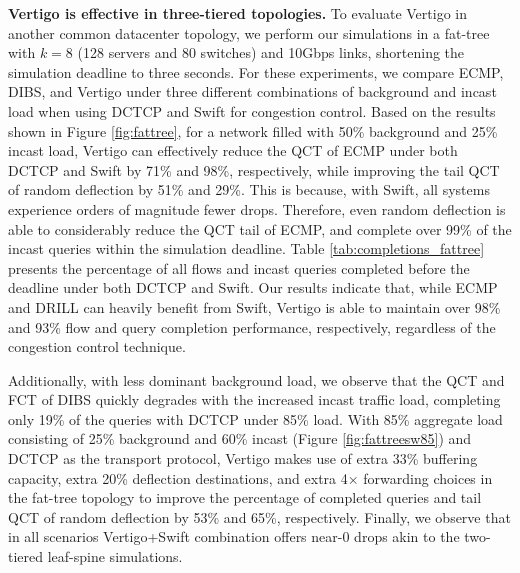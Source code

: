 \textbf{Vertigo is effective in three-tiered topologies.}
To evaluate Vertigo in another common datacenter topology, we perform our simulations in a fat-tree \cite{fattree} with $k=8$ (128 servers and 80 switches) and 10Gbps links, shortening the simulation deadline to three seconds. For these experiments, we compare ECMP, DIBS, and Vertigo under three different combinations of background and incast load when using DCTCP and Swift for congestion control. Based on the results shown in Figure \ref{fig:fattree}, for a network filled with 50\% background and 25\% incast load, Vertigo can effectively reduce the QCT of ECMP under both DCTCP and Swift by 71\% and 98\%, respectively, while improving the tail QCT of random deflection by 51\% and 29\%.
This is because, with Swift, all systems experience orders of magnitude fewer drops. Therefore, even random deflection is able to considerably reduce the QCT tail of ECMP, and complete over 99\% of the incast queries within the simulation deadline. 
Table \ref{tab:completions_fattree} presents the percentage of all flows and incast queries completed before the deadline under both DCTCP and Swift. Our results indicate that, while ECMP and DRILL can heavily benefit from Swift, Vertigo is able to maintain over 98\% and 93\% flow and query completion performance, respectively, regardless of the congestion control technique. 




Additionally, with less dominant background load, we observe that the QCT and FCT of DIBS quickly degrades with the increased incast traffic load, completing only 19\% of the queries with DCTCP under 85\% load. With 85\% aggregate load consisting of 25\% background and 60\% incast (Figure \ref{fig:fattreesw85}) and DCTCP as the transport protocol, Vertigo makes use of extra 33\% buffering capacity, extra 20\% deflection destinations, and extra 4$\times$ forwarding choices in the fat-tree topology to improve the percentage of completed queries and tail QCT of random deflection by 53\% and 65\%, respectively. Finally, we observe that in all scenarios Vertigo+Swift combination offers near-0 drops akin to the two-tiered leaf-spine simulations.


